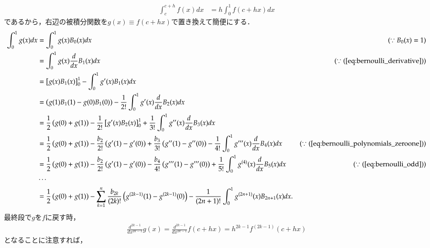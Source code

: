 \documentclass[a4j,papersize,disablejfam,slide,14pt]{jsarticle}
\begin{document}
    \begin{align}
    	\int_{c}^{c+h}f(x)dx &= h \int_{0}^{1} f(c+hx)dx
    \end{align}
    であるから，右辺の被積分関数を$g(x) \equiv f(c+hx)$で置き換えて簡便にする．
    \begin{align}
    	\int_{0}^{1} g(x) dx &= \int_{0}^{1} g(x) B_0(x)dx & (\because B_0(x)=1)\\
        &= \int_{0}^{1} g(x) \frac{d}{dx}B_1(x)dx & (\because (\refeq{eq:bernoulli_derivative})) \\
        &= \left[ g(x) B_1(x) \right]_{0}^{1} - \int_{0}^{1} g'(x) B_1(x)dx \\
        &= \left( g(1) B_1(1) - g(0) B_1(0) \right) - \frac{1}{2!} \int_{0}^{1} g'(x) \frac{d}{dx} B_2(x)dx \\
        &= \frac{1}{2} \left( g(0)+g(1) \right) - \frac{1}{2!} \left[ g'(x) B_2(x) \right]_{0}^{1} 
        	+ \frac{1}{3!} \int_{0}^{1} g''(x) \frac{d}{dx}B_3(x)dx \\
        &= \frac{1}{2} \left( g(0)+g(1) \right) - \frac{b_2}{2!} \left( g'(1) - g'(0) \right) 
        	+ \frac{b_3}{3!} \left( g''(1) - g''(0) \right) 
            - \frac{1}{4!} \int_{0}^{1} g'''(x) \frac{d}{dx} B_4(x)dx & (\because (\refeq{eq:bernoulli_polynomials_zeroone})) \\
        &= \frac{1}{2} \left( g(0)+g(1) \right) - \frac{b_2}{2!} \left( g'(1) - g'(0) \right)
            - \frac{b_4}{4!} \left( g'''(1) - g'''(0) \right) + \frac{1}{5!} \int_{0}^{1} g^{(4)}(x) \frac{d}{dx} B_5(x)dx & (\because (\refeq{eq:bernoulli_odd}))\\
        &\cdots \\
        &= \frac{1}{2} \left( g(0)+g(1) \right) 
        	- \sum_{k=1}^{n} \frac{b_{2k}}{(2k)!} \left( g^{(2k-1)}(1) - g^{(2k-1)}(0) \right)
            - \frac{1}{(2n+1)!} \int_{0}^{1} g^{(2n+1)}(x) B_{2n+1}(x)dx.
    \end{align}
    最終段で$g$を$f$に戻す時，
    \begin{align}
    	\frac{d^{2k-1}}{dx^{2k-1}} g(x) = \frac{d^{2k-1}}{dx^{2k-1}} f(c+hx) = h^{2k-1} f^{(2k-1)} (c+hx)
    \end{align}
    となることに注意すれば，
\end{document}
